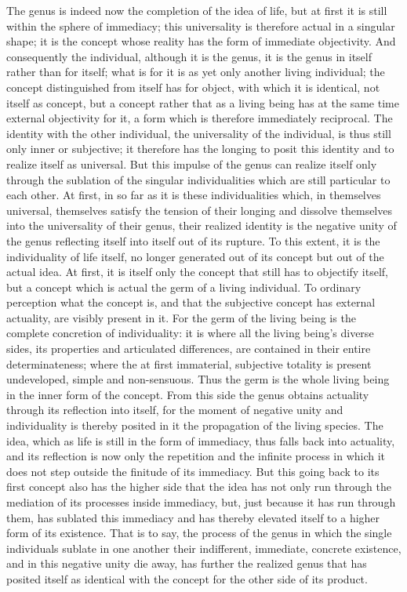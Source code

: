 The genus is indeed now the completion of the idea of life,
but at first it is still within the sphere of immediacy;
this universality is therefore actual in a singular shape;
it is the concept whose reality has the form of immediate objectivity.
And consequently the individual, although it is the genus,
it is the genus in itself rather than for itself;
what is for it is as yet only another living individual;
the concept distinguished from itself has for object,
with which it is identical, not itself as concept,
but a concept rather that as a living being has
at the same time external objectivity for it,
a form which is therefore immediately reciprocal.
The identity with the other individual,
the universality of the individual,
is thus still only inner or subjective;
it therefore has the longing to posit
this identity and to realize itself as universal.
But this impulse of the genus can realize itself
only through the sublation of the singular individualities
which are still particular to each other.
At first, in so far as it is these individualities
which, in themselves universal, themselves satisfy
the tension of their longing and dissolve themselves
into the universality of their genus,
their realized identity is the negative unity
of the genus reflecting itself into itself out of its rupture.
To this extent, it is the individuality of life itself,
no longer generated out of its concept but out of the actual idea.
At first, it is itself only the concept
that still has to objectify itself,
but a concept which is actual
the germ of a living individual.
To ordinary perception what the concept is,
and that the subjective concept has external actuality,
are visibly present in it.
For the germ of the living being is
the complete concretion of individuality:
it is where all the living being's diverse sides,
its properties and articulated differences,
are contained in their entire determinateness;
where the at first immaterial, subjective totality is
present undeveloped, simple and non-sensuous.
Thus the germ is the whole living being
in the inner form of the concept.
From this side the genus obtains actuality
through its reflection into itself,
for the moment of negative unity
and individuality is thereby posited in it
the propagation of the living species.
The idea, which as life is still
in the form of immediacy,
thus falls back into actuality,
and its reflection is now only
the repetition and the infinite process
in which it does not step outside the finitude of its immediacy.
But this going back to its first concept also has
the higher side that the idea has not only run through
the mediation of its processes inside immediacy,
but, just because it has run through them,
has sublated this immediacy
and has thereby elevated itself
to a higher form of its existence.
That is to say, the process of the genus
in which the single individuals sublate in one another
their indifferent, immediate, concrete existence,
and in this negative unity die away,
has further the realized genus
that has posited itself as identical
with the concept for the other side of its product.

